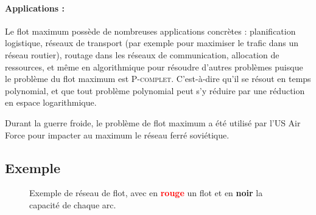 \documentclass[a4paper]{article}
\begin{document}
\paragraph{Applications :} Le flot maximum possède de nombreuses applications concrètes : planification logistique, réseaux de transport (par exemple pour maximiser le trafic dans un réseau routier), routage dans les réseaux de communication, allocation de ressources, et même en algorithmique pour résoudre d’autres problèmes puisque le problème du flot maximum est \textsc{P-complet}. C'est-à-dire qu'il se résout en temps polynomial, et que tout problème polynomial peut s'y réduire par une réduction en espace logarithmique\cite{GOLDSCHLAGER1982105}.

Durant la guerre froide, le problème de flot maximum a été utilisé par l'US Air Force pour impacter au maximum le réseau ferré soviétique\cite{schrijver2002history}.
\subsection{Exemple}
\begin{figure}[H]
	\begin{center}
		\caption{Exemple de réseau de flot, avec en \textcolor{red}{\textbf{rouge}} un flot et en \textbf{noir} la capacité de chaque arc.}
	\end{center}
\end{figure}
\end{document}
